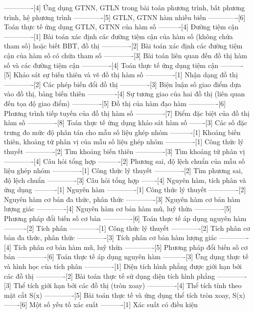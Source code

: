 -------------[4] Ứng dụng GTNN, GTLN trong bài toán phương trình, bất phương trình, hệ phương trình
-------------[5] GTLN, GTNN hàm nhiều biến
-------------[6] Toán thực tế ứng dụng GTLN, GTNN của hàm số
----------[4] Đường tiệm cận
-------------[1] Bài toán xác định các đường tiệm cận của hàm số (không chứa tham số) hoặc biết BBT, đồ thị
-------------[2] Bài toán xác định các đường tiệm cận của hàm số có chứa tham số
-------------[3] Bài toán liên quan đến đồ thị hàm số và các đường tiệm cận
-------------[4] Toán thực tế ứng dụng tiệm cận
----------[5] Khảo sát sự biến thiên và vẽ đồ thị hàm số
-------------[1] Nhận dạng đồ thị
-------------[2] Các phép biến đổi đồ thị
-------------[3] Biện luận số giao điểm dựa vào đồ thị, bảng biến thiên
-------------[4] Sự tương giao của hai đồ thị (liên quan đến tọa độ giao điểm)
-------------[5] Đồ thị của hàm đạo hàm
-------------[6] Phương trình tiếp tuyến của đồ thị hàm số
-------------[7] Điểm đặc biệt của đồ thị hàm số
-------------[8] Toán thực tế ứng dụng khảo sát hàm số
-------[3] Các số đặc trưng đo mức độ phân tán cho mẫu số liệu ghép nhóm
----------[1] Khoảng biến thiên, khoảng tứ phân vị của mẫu số liệu ghép nhóm
-------------[1] Công thức lý thuyết
-------------[2] Tìm khoảng biến thiên
-------------[3] Tìm khoảng tứ phân vị
-------------[4] Câu hỏi tổng hợp
----------[2] Phương sai, độ lệch chuẩn của mẫu số liệu ghép nhóm
-------------[1] Công thức lý thuyết
-------------[2] Tìm phương sai, độ lệch chuẩn
-------------[3] Câu hỏi tổng hợp
-------[4] Nguyên hàm, tích phân và ứng dụng
----------[1] Nguyên hàm
-------------[1] Công thức lý thuyết
-------------[2] Nguyên hàm cơ bản đa thức, phân thức
-------------[3] Nguyên hàm cơ bản hàm lượng giác
-------------[4] Nguyên hàm cơ bản hàm mũ, luỹ thừa
-------------[5] Phương pháp đổi biến số cơ bản
-------------[6] Toán thực tế áp dụng nguyên hàm
----------[2] Tích phân
-------------[1] Công thức lý thuyết
-------------[2] Tích phân cơ bản đa thức, phân thức
-------------[3] Tích phân cơ bản hàm lượng giác
-------------[4] Tích phân cơ bản hàm mũ, luỹ thừa
-------------[5] Phương pháp đổi biến số cơ bản
-------------[6] Toán thực tế áp dụng nguyên hàm
----------[3] Ứng dụng thực tế và hình học của tích phân
-------------[1] Diện tích hình phẳng được giới hạn bởi các đồ thị
-------------[2] Bài toán thực tế sử dụng diện tích hình phẳng
-------------[3] Thể tích giới hạn bởi các đồ thị (tròn xoay)
-------------[4] Thể tích tính theo mặt cắt S(x)
-------------[5] Bài toán thực tế và ứng dụng thể tích tròn xoay, S(x)
-------[6] Một số yếu tố xác suất
----------[1] Xác suất có điều kiện
